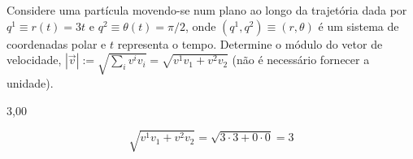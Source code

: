 \begin{question}
    Considere uma partícula movendo-se num plano ao longo da trajetória dada por $q^1 \equiv r(t) = 3t$ e $q^2 \equiv \theta(t) = \pi/2$, onde $(q^1, q^2) \equiv (r,\theta)$ é um sistema de coordenadas polar e $t$ representa o tempo.
    Determine o módulo do vetor de velocidade, $|\vec v| := \sqrt{\sum_{i} v^i v_i} = \sqrt{v^1 v_1 + v^2 v_2}$ (não é necessário fornecer a unidade).

    \begin{answer}
      3,00
    \end{answer}

    \begin{solution}
      \begin{equation*}
        \sqrt{v^1 v_1 + v^2 v_2} = \sqrt{3 \cdot 3 + 0 \cdot 0} = 3
      \end{equation*}
    \end{solution}
\end{question}